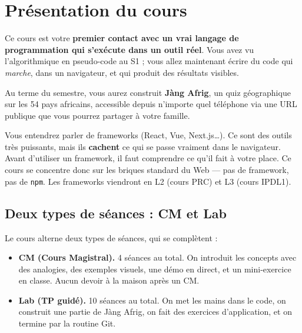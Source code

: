 \documentclass[11pt,a4paper]{article}
\begin{document}
\tableofcontents

\newpage

\section{Présentation du cours}

Ce cours est votre \textbf{premier contact avec un vrai langage de
programmation qui s'exécute dans un outil réel}. Vous avez vu l'algorithmique
en pseudo-code au S1 ; vous allez maintenant écrire du code qui
\textit{marche}, dans un navigateur, et qui produit des résultats visibles.

Au terme du semestre, vous aurez construit \textbf{Jàng Afrig}, un quiz
géographique sur les 54 pays africains, accessible depuis n'importe quel
téléphone via une URL publique que vous pourrez partager à votre famille.

\begin{infobox}
Vous entendrez parler de frameworks (React, Vue, Next.js\ldots). Ce sont des
outils très puissants, mais ils \textbf{cachent} ce qui se passe vraiment
dans le navigateur. Avant d'utiliser un framework, il faut comprendre ce
qu'il fait à votre place. Ce cours se concentre donc sur les briques
standard du Web --- pas de framework, pas de \texttt{npm}. Les frameworks
viendront en L2 (cours PRC) et L3 (cours IPDL1).
\end{infobox}

\subsection{Deux types de séances : CM et Lab}

Le cours alterne deux types de séances, qui se complètent :

\begin{itemize}[leftmargin=*]
    \item \textbf{CM (Cours Magistral).} 4 séances au total. On introduit
          les concepts avec des analogies, des exemples visuels, une démo
          en direct, et un mini-exercice en classe. Aucun devoir à la
          maison après un CM.

    \item \textbf{Lab (TP guidé).} 10 séances au total. On met les mains
          dans le code, on construit une partie de Jàng Afrig, on fait des
          exercices d'application, et on termine par la routine Git.
\end{itemize}
\end{document}
